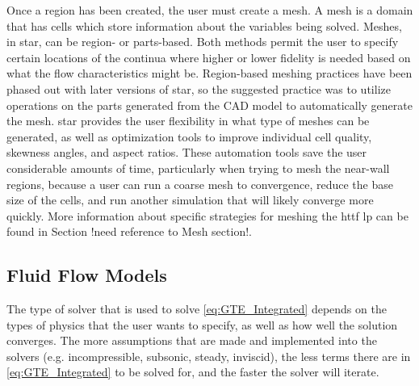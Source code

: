 \documentclass[double,12pt]{beavtex}
\begin{document}
Once a region has been created, the user must create a mesh. A mesh is a domain that has cells which store information about the variables being solved. Meshes, in \acrshort{star}, can be region- or parts-based. Both methods permit the user to specify certain locations of the continua where higher or lower fidelity is needed based on what the flow characteristics might be. Region-based meshing practices have been phased out with later versions of \acrshort{star}, so the suggested practice was to utilize operations on the parts generated from the CAD model to automatically generate the mesh. \acrshort{star} provides the user flexibility in what type of meshes can be generated, as well as optimization tools to improve individual cell quality, skewness angles, and aspect ratios. These automation tools save the user considerable amounts of time, particularly when trying to mesh the near-wall regions, because a user can run a coarse mesh to convergence, reduce the base size of the cells, and run another simulation that will likely converge more quickly. More information about specific strategies for meshing the \acrshort{httf} \acrshort{lp} can be found in Section !need reference to Mesh section!.

\subsection{Fluid Flow Models}

The type of solver that is used to solve \ref{eq:GTE_Integrated} depends on the types of physics that the user wants to specify, as well as how well the solution converges. The more assumptions that are made and implemented into the solvers (e.g. incompressible, subsonic, steady, inviscid), the less terms there are in \ref{eq:GTE_Integrated} to be solved for, and the faster the solver will iterate.
\end{document}
